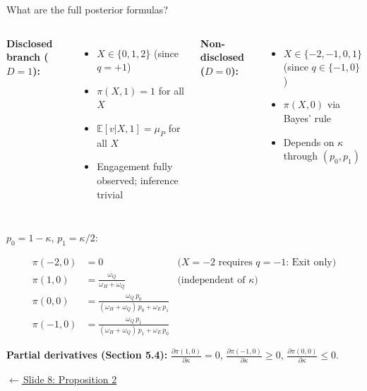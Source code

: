 \documentclass[aspectratio=169,10pt]{beamer}
\newcommand{\E}{\mathbb{E}}
\newcommand{\1}{\mathbf{1}}
\newcommand{\returnlink}[2]{%
  \par\vspace{0.2em}\hfill{\scriptsize\hyperlink{#1}{\textcolor{brightblue}{$\leftarrow$\,#2}}}%
}
\begin{document}
\begin{frame}{What are the full posterior formulas?}
\hypertarget{backup:full_posteriors}{}
\scriptsize
\begin{columns}[T,onlytextwidth]
\textbf{Disclosed branch ($D=1$):}
\begin{itemize}\itemsep0.05em
  \item $X \in \{0, 1, 2\}$ (since $q = +1$)
  \item $\pi(X, 1) = 1$ for all $X$
  \item $\E[v|X,1] = \mu_P$ for all $X$
  \item Engagement fully observed; inference trivial
\end{itemize}

\textbf{Non-disclosed ($D=0$):}
\begin{itemize}\itemsep0.05em
  \item $X \in \{-2, -1, 0, 1\}$ (since $q \in \{-1, 0\}$)
  \item $\pi(X, 0)$ via Bayes' rule
  \item Depends on $\kappa$ through $(p_0, p_1)$
\end{itemize}
\end{columns}

\vspace{0.2em}

$p_0 = 1 - \kappa$, $p_1 = \kappa/2$:

\begin{align*}
\pi(-2,0) &= 0 &\text{($X=-2$ requires $q=-1$: Exit only)}\\
\pi(1,0)  &= \frac{\omega_Q}{\omega_H + \omega_Q} &\text{(independent of $\kappa$)}\\
\pi(0,0)  &= \frac{\omega_Q\,p_0}{(\omega_H + \omega_Q)\,p_0 + \omega_E\,p_1}\\
\pi(-1,0) &= \frac{\omega_Q\,p_1}{(\omega_H + \omega_Q)\,p_1 + \omega_E\,p_0}
\end{align*}

\vspace{0.1em}

\textbf{Partial derivatives (Section 5.4):}
$\frac{\partial\pi(1,0)}{\partial\kappa} = 0$, \;
$\frac{\partial\pi(-1,0)}{\partial\kappa} \ge 0$, \;
$\frac{\partial\pi(0,0)}{\partial\kappa} \le 0$.

\returnlink{main:prop2}{Slide 8: Proposition 2}
\end{frame}
\end{document}
